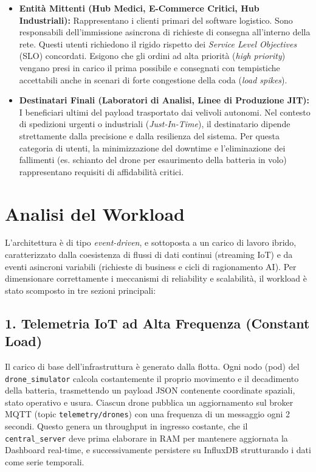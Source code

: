 \begin{itemize}
    \item \textbf{Entità Mittenti (Hub Medici, E-Commerce Critici, Hub Industriali):}
    Rappresentano i clienti primari del software logistico. %
    Sono responsabili dell'immissione asincrona di richieste di consegna all'interno della rete. %
    Questi utenti richiedono il rigido rispetto dei \textit{Service Level Objectives} (SLO) concordati. %
    Esigono che gli ordini ad alta priorità (\textit{high priority}) vengano presi in carico il prima possibile e consegnati con tempistiche accettabili anche in scenari di forte congestione della coda (\textit{load spikes}). %

    \item \textbf{Destinatari Finali (Laboratori di Analisi, Linee di Produzione JIT):}
    I beneficiari ultimi del payload trasportato dai velivoli autonomi. %
    Nel contesto di spedizioni urgenti o industriali (\textit{Just-In-Time}), il destinatario dipende strettamente dalla precisione e dalla resilienza del sistema. %
    Per questa categoria di utenti, la minimizzazione del downtime e l'eliminazione dei fallimenti (es. schianto del drone per esaurimento della batteria in volo) rappresentano requisiti di affidabilità critici. %
\end{itemize}

\section{Analisi del Workload}
\label{sec:analisi_workload}

L'architettura è di tipo \textit{event-driven}, e sottoposta a un carico di lavoro ibrido, caratterizzato dalla coesistenza di flussi di dati continui (streaming IoT) e da eventi asincroni variabili (richieste di business e cicli di ragionamento AI). Per dimensionare correttamente i meccanismi di reliability e scalabilità, il workload è stato scomposto in tre sezioni principali:

\subsection*{1. Telemetria IoT ad Alta Frequenza (Constant Load)}
Il carico di base dell'infrastruttura è generato dalla flotta. Ogni nodo (pod) del \texttt{drone\_simulator} calcola costantemente il proprio movimento e il decadimento della batteria, trasmettendo un payload JSON contenente coordinate spaziali, stato operativo e usura. 
Ciascun drone pubblica un aggiornamento sul broker MQTT (topic \texttt{telemetry/drones}) con una frequenza di un messaggio ogni 2 secondi. Questo genera un throughput in ingresso costante, che il \texttt{central\_server} deve prima elaborare in RAM per mantenere aggiornata la Dashboard real-time, e successivamente persistere su InfluxDB strutturando i dati come serie temporali.

